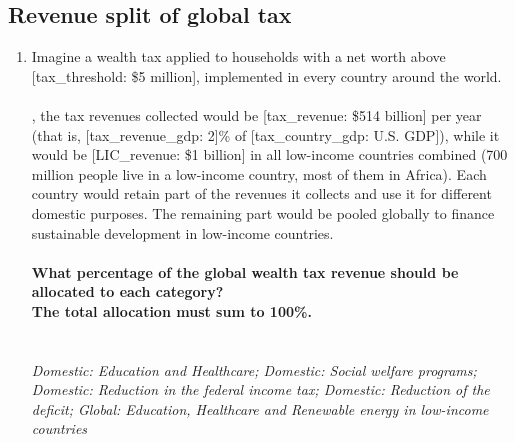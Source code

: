  \subsection*{Revenue split of global tax} 
 \begin{enumerate}[resume] 
\item  \label{q:revenue_split_few} Imagine a wealth tax applied to households with a net worth above [tax\_threshold: \$5 million], implemented in every country around the world.
\\\\[tax\_country\_name: In the U.S.], the tax revenues collected would be [tax\_revenue: \$514 billion] per year (that is, [tax\_revenue\_gdp: 2]\% of [tax\_country\_gdp: U.S. GDP]), while it would be [LIC\_revenue: \$1 billion] in all low-income countries combined (700 million people live in a low-income country, most of them in Africa).
Each country would retain part of the revenues it collects and use it for different domestic purposes. The remaining part would be pooled globally to finance sustainable development in low-income countries.
\\\\\textbf{What percentage of the global wealth tax revenue should be allocated to each category?} \\\textbf{The total allocation must sum to 100\%.}\\\\ [\textit{Figure \ref{fig:revenue_split_few}}; 
\verb|revenue_split_few|]
  \\ \textit{Domestic: Education and Healthcare; Domestic: Social welfare programs; Domestic: Reduction in the federal income tax; Domestic: Reduction of the deficit; Global: Education, Healthcare and Renewable energy in low-income countries}


\end{enumerate}

